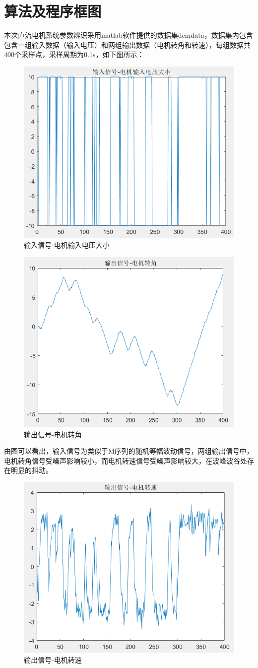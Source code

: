 \documentclass[UTF8, twocolumn]{article}
\begin{document}
\section{算法及程序框图}
本次直流电机系统参数辨识采用matlab软件提供的数据集dcmdata，数据集内包含包含一组输入数据（输入电压）和两组输出数据（电机转角和转速），每组数据共400个采样点，采样周期为0.1s，如下图所示：
\begin{figure}[H]
    \centering %
    \includegraphics[width=.4\textwidth]{figure/输入信号-电机输入电压大小.png} 
    \caption{输入信号-电机输入电压大小} %
\end{figure}
\begin{figure}[H]
    \centering %
    \includegraphics[width=.4\textwidth]{figure/输出信号-电机转角.png} 
    \caption{输出信号-电机转角} %
\end{figure}

由图可以看出，输入信号为类似于M序列的随机等幅波动信号，两组输出信号中，电机转角信号受噪声影响较小，而电机转速信号受噪声影响较大，在波峰波谷处存在明显的抖动。

\begin{figure}[H]
    \centering %
    \includegraphics[width=.4\textwidth]{figure/输出信号-电机转速.png} 
    \caption{输出信号-电机转速} %
\end{figure}
\end{document}
